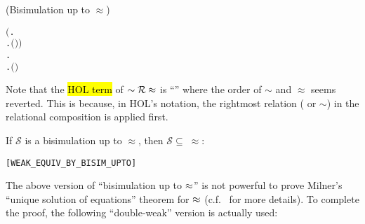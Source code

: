 \begin{definition}{(Bisimulation up to $\approx$)}
\begin{alltt}
          \ensuremath{(}\HOLSymConst{\HOLTokenForall{}}.
                \HOLTokenTransBegin\HOLSymConst{\ensuremath{\tau}}\HOLTokenTransEnd {} \HOLSymConst{\HOLTokenImp{}}
               \HOLSymConst{\HOLTokenExists{}}.  \HOLSymConst{\HOLTokenEPS}  \HOLSymConst{\HOLTokenConj{}} \ensuremath{(} \HOLSymConst{\HOLTokenRCompose{}}  \HOLSymConst{\HOLTokenRCompose{}} \ensuremath{)}  \ensuremath{)} \HOLSymConst{\HOLTokenConj{}}
          \HOLSymConst{\HOLTokenForall{}}.
               \HOLTokenTransBegin\HOLSymConst{\ensuremath{\tau}}\HOLTokenTransEnd {} \HOLSymConst{\HOLTokenImp{}}
              \HOLSymConst{\HOLTokenExists{}}.  \HOLSymConst{\HOLTokenEPS}  \HOLSymConst{\HOLTokenConj{}} \ensuremath{(} \HOLSymConst{\HOLTokenRCompose{}}  \HOLSymConst{\HOLTokenRCompose{}} \ensuremath{)}  
\end{alltt}
\end{definition}
Note that the \hl{HOL term} of $\sim {\cal R} \approx$ is
``'' where the order of
$\sim$ and $\approx$ seems reverted. This is because, in HOL's
notation, the rightmost relation ( or $\sim$) in the relational composition is
applied first.

\begin{theorem}
If $\mathcal{S}$ is a bisimulation up to $\approx$, then
$\mathcal{S} \subseteq\;\approx$:
\begin{alltt}
\HOLTokenTurnstile{}   \HOLSymConst{\HOLTokenConj{}}    \HOLSymConst{\HOLTokenImp{}}  \HOLSymConst{\HOLTokenWeakEQ} \hfill{[WEAK_EQUIV_BY_BISIM_UPTO]}
\end{alltt}
\end{theorem}

The above version of ``bisimulation up to $\approx$'' 
is not powerful to prove Milner's ``unique solution of equations''
theorem for $\approx$ (c.f.~\cite{sangiorgi1992problem} for more details).
To complete the proof, the following ``double-weak'' version is
actually used:

